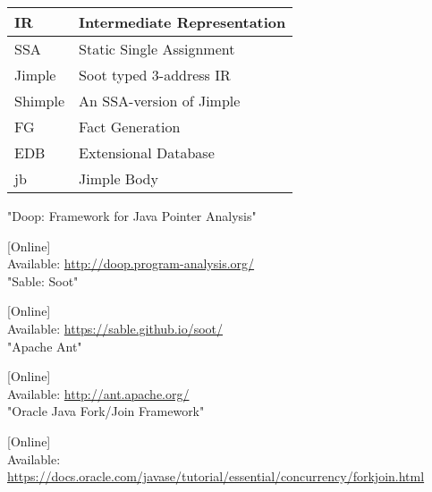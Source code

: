 \documentclass{dithesis}
\begin{document}
\begin{thesisabbreviations}
	\begin{tabularx}{\textwidth}{|X|X|}
        \hline
        IR & Intermediate Representation \\
        \hline
        SSA & Static Single Assignment \\
        \hline
        Jimple & Soot typed 3-address IR \\
        \hline
        Shimple & An SSA-version of Jimple \\
        \hline
        FG & Fact Generation \\
        \hline
        EDB & Extensional Database \\
        \hline
        jb & Jimple Body \\
		\hline
	\end{tabularx}
\end{thesisabbreviations}


\begin{thesisbibliography}[References]{99}
		"Doop: Framework for Java Pointer Analysis"

        [Online] \\ Available: \url{http://doop.program-analysis.org/} \\
		"Sable: Soot"

        [Online] \\ Available: \url{https://sable.github.io/soot/} \\
		"Apache Ant"

        [Online] \\ Available: \url{http://ant.apache.org/} \\
        "Oracle Java Fork/Join Framework"

        [Online] \\ Available: \url{https://docs.oracle.com/javase/tutorial/essential/concurrency/forkjoin.html} \\
\end{thesisbibliography}
\end{document}
